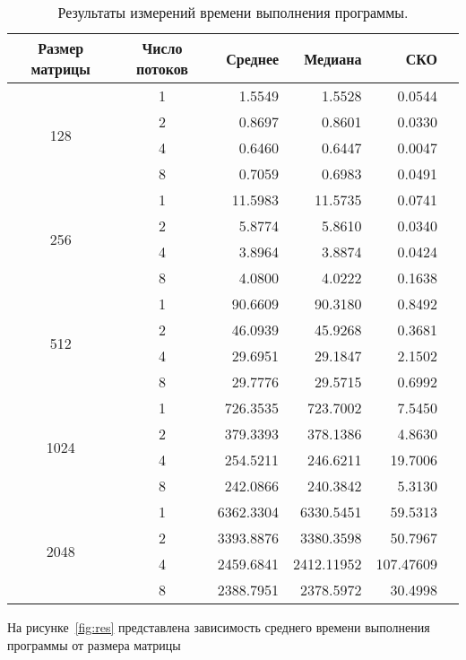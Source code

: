\documentclass[a4paper,14pt]{extarticle}
\begin{document}
    \begin{table}[t]
        \centering
        \begin{tabular}{ccrrrr}
            \toprule
            Размер матрицы & Число потоков & Среднее & Медиана & СКО  \\
            \midrule
            \multirow{4}{*}{128} & 1 & 1.5549 & 1.5528 & 0.0544 \\
            & 2 & 0.8697 & 0.8601 & 0.0330 \\
            & 4 & 0.6460 & 0.6447 & 0.0047 \\
            & 8 & 0.7059 & 0.6983 & 0.0491 \\
            \midrule
            \multirow{4}{*}{256} & 1 & 11.5983 & 11.5735 & 0.0741 \\
            & 2 & 5.8774 & 5.8610 & 0.0340 \\
            & 4 & 3.8964 & 3.8874 & 0.0424 \\
            & 8 & 4.0800 & 4.0222 & 0.1638 \\
            \midrule
            \multirow{4}{*}{512} & 1 & 90.6609 & 90.3180 & 0.8492 \\
            & 2 & 46.0939 & 45.9268 & 0.3681 \\
            & 4 & 29.6951 & 29.1847 & 2.1502 \\
            & 8 & 29.7776 & 29.5715 & 0.6992 \\
            \midrule
            \multirow{4}{*}{1024} & 1 & 726.3535 & 723.7002 & 7.5450 \\
            & 2 & 379.3393 & 378.1386 & 4.8630  \\
            & 4 & 254.5211 & 246.6211 & 19.7006 \\
            & 8 & 242.0866 & 240.3842 & 5.3130 \\
            \midrule
            \multirow{4}{*}{2048} & 1 & 6362.3304 & 6330.5451 & 59.5313 \\
            & 2 & 3393.8876 & 3380.3598 & 50.7967 \\
            & 4 & 2459.6841 & 2412.11952 & 107.47609 \\
            & 8 & 2388.7951 & 2378.5972 & 30.4998 \\
            \bottomrule
        \end{tabular}
        \caption{Результаты измерений времени выполнения программы.}
        \label{tab:res}
    \end{table}
    На рисунке~\ref{fig:res} представлена зависимость среднего времени выполнения программы от размера матрицы
\end{document}
